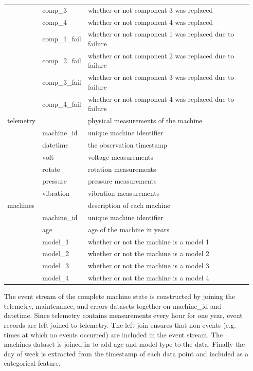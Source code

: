 \documentclass{article}
\begin{document}
\begin{table}[!ht]
\begin{tabular}{lll}
            & comp\_3		& whether or not component 3 was replaced\\
            & comp\_4		& whether or not component 4 was replaced\\
            & comp\_1\_fail	& whether or not component 1 was replaced due to failure\\
            & comp\_2\_fail	& whether or not component 2 was replaced due to failure\\
            & comp\_3\_fail	& whether or not component 3 was replaced due to failure\\
            & comp\_4\_fail	& whether or not component 4 was replaced due to failure\\
\midrule
telemetry 	&				& physical measurements of the machine\\
			& machine\_id 	& unique machine identifier\\
			& datetime 		& the observation timestamp\\
            & volt			& voltage measurements\\
            & rotate		& rotation measurements\\
            & pressure		& pressure measurements\\ 
            & vibration		& vibration measurements\\
\midrule
machines	&				& description of each machine\\
			& machine\_id	& unique machine identifier\\
            & age			& age of the machine in years\\
            & model\_1		& whether or not the machine is a model 1\\
            & model\_2		& whether or not the machine is a model 2\\
            & model\_3		& whether or not the machine is a model 3\\
            & model\_4		& whether or not the machine is a model 4\\
\bottomrule
\end{tabular}
\end{table}

The event stream of the complete machine state is constructed by joining the telemetry, maintenance, and errors datasets together on machine\_id and datetime. Since telemetry contains measurements every hour for one year, event records are left joined to telemetry. The left join ensures that non-events (e.g. times at which no events occurred) are included in the event stream. The machines dataset is joined in to add age and model type to the data. Finally the day of week is extracted from the timestamp of each data point and included as a categorical feature.
\end{document}
